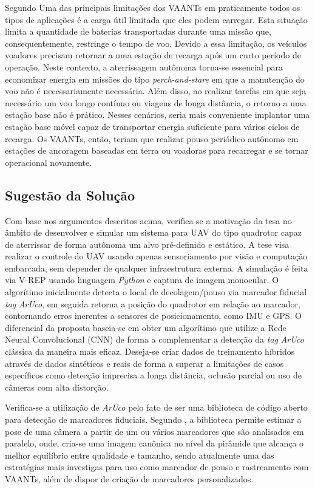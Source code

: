 Segundo \citet{Gilberto2016} Uma das principais limitações dos VAANTs em praticamente todos os tipos de aplicações é a carga útil limitada que eles podem carregar. Esta situação limita a quantidade de baterias transportadas durante uma missão que, consequentemente, restringe o tempo de voo. Devido a essa limitação, os veículos voadores precisam retornar a uma estação de recarga após um curto período de operação. Neste contexto, a aterrissagem autônoma torna-se essencial para economizar energia em missões do tipo \textit{perch-and-stare} em que a manutenção do voo não é necessariamente necessária. Além disso, ao realizar tarefas em que seja necessário um voo longo contínuo ou viagens de longa distância, o retorno a uma estação base não é prático. Nesses cenários, seria mais conveniente implantar uma estação base móvel capaz de transportar energia suficiente para vários ciclos de recarga. Os VAANTs, então, teriam que realizar pouso periódico autônomo em estações de ancoragem baseadas em terra ou voadoras para recarregar e se tornar operacional novamente.

\subsection{Sugestão da Solução}

Com base nos argumentos descritos acima, verifica-se a motivação da tesa no âmbito de desenvolver e simular um sistema para UAV do tipo quadrotor capaz de aterrissar de forma autônoma um alvo pré-definido e estático. A tese visa realizar o controle do UAV usando apenas sensoriamento por visão e computação embarcada, sem depender de qualquer infraestrutura externa. A simulação é feita via V-REP usando linguagem \textit{Python} e captura de imagem monocular. O algorítimo inicialmente detecta o local de decolagem/pouso via marcador fiducial \textit{tag} \textit{ArUco}, em seguida retorna a posição do quadrotor em relação ao marcador, contornando erros inerentes a sensores de posicionamento, como IMU e GPS. O diferencial da proposta baseia-se em obter um algorítimo que utilize a Rede Neural Convolucional (CNN) de forma a complementar a detecção da \textit{tag} \textit{ArUco} clássica da maneira mais eficaz. Deseja-se criar dados de treinamento híbridos através de dados sintéticos e reais de forma a superar a limitações de casos específicos como detecção imprecisa a longa distância, oclusão parcial ou uso de câmeras com alta distorção. 

Verifica-se a utilização de \textit{ArUco} pelo fato de ser uma biblioteca de código aberto para detecção de marcadores fiduciais. Segundo \citet{Aruco2014}, a biblioteca permite estimar a pose de uma câmera a partir de um ou vários marcadores que são analisados em paralelo, onde, cria-se uma imagem canônica no nível da pirâmide que alcança o melhor equilíbrio entre qualidade e tamanho, sendo atualmente uma das estratégias mais investigas para uso como marcador de pouso e rastreamento com VAANTs, além de dispor de criação de marcadores personalizados. 


